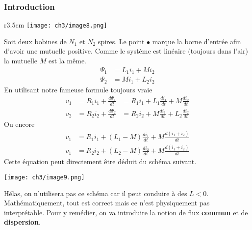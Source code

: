 		\subsubsection{Introduction}
				\begin{wrapfigure}[5]{r}{3.5cm}
		\vspace{-27mm}
		\texttt{[image: ch3/image8.png]}
		\end{wrapfigure}
		Soit deux bobines de $N_1$ et $N_2$ spires. Le point $\bullet$ marque 
		la borne d'entrée afin d'avoir une mutuelle positive. Comme le 
		système est linéaire (toujours dans l'air) la mutuelle $M$ est la même.
		\begin{equation}
		\begin{array}{ll}
		\Psi_1 &= L_1i_1 + Mi_2\\
		\Psi_2 &= Mi_1 + L_2i_2
		\end{array}
		\end{equation}
		En utilisant notre fameuse formule toujours vraie
		\begin{equation}
		\begin{array}{lll}
		v_1 &= R_1i_1 + \frac{d\Psi_1}{dt} &= R_1i_1 + L_1\frac{di_1}{dt}+M\frac{
		di_2}{dt}\\
		v_2 &= R_2i_2 + \frac{d\Psi_2}{dt} &= R_2i_2 + M\frac{di_1}{dt}+L_2\frac{
		di_2}{dt}
		\end{array}
		\end{equation}
		Ou encore
		\begin{equation}
		\begin{array}{ll}
		v_1 &= R_1i_1 + (L_1-M)\frac{di_1}{dt} + M\frac{d(i_1+i_2)}{dt}\\
		v_1 &= R_2i_2 + (L_2-M)\frac{di_2}{dt} + M\frac{d(i_1+i_2)}{dt}		
		\end{array}
		\end{equation}
		Cette équation peut directement être déduit du schéma suivant. 
		\begin{center}
				\texttt{[image: ch3/image9.png]}
		\end{center}
		Hélas, on n'utilisera pas ce schéma car il peut conduire à des $L<0$. 
		Mathématiquement, tout est correct mais ce n'est physiquement pas 
		interprétable. Pour y remédier, on va introduire la notion de flux \textbf{commun} 
		et de \textbf{dispersion}.
		
